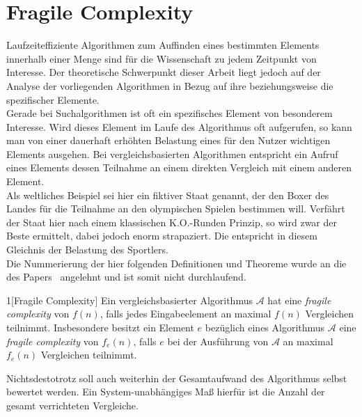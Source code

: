 \section{Fragile Complexity}	%

\noindent
Laufzeiteffiziente Algorithmen zum Auffinden eines bestimmten Elements innerhalb einer Menge sind für die Wissenschaft zu jedem Zeitpunkt von Interesse. Der theoretische Schwerpunkt dieser Arbeit liegt jedoch auf der Analyse der vorliegenden Algorithmen in Bezug auf ihre \fg beziehungsweise die spezifischer Elemente.\\[.1cm]
Gerade bei Suchalgorithmen ist oft ein spezifisches Element von besonderem Interesse. Wird dieses Element im Laufe des Algorithmus oft aufgerufen, so kann man von einer dauerhaft erhöhten Belastung eines für den Nutzer wichtigen Elements ausgehen. Bei vergleichsbasierten Algorithmen entspricht ein Aufruf eines Elements dessen Teilnahme an einem direkten Vergleich mit einem anderen Element.\\[.05cm]
Als weltliches Beispiel sei hier ein fiktiver Staat genannt, der den Boxer des Landes für die Teilnahme an den olympischen Spielen bestimmen will. Verfährt der Staat hier nach einem klassischen K.O.-Runden Prinzip, so wird zwar der Beste ermittelt, dabei jedoch enorm strapaziert. Die \fg entspricht in diesem Gleichnis der Belastung des Sportlers.\\[.05cm]
Die Nummerierung der hier folgenden Definitionen und Theoreme wurde an die des Papers~\cite{meyer2} angelehnt und ist somit nicht durchlaufend.
\begin{manualdefinition}{1}[Fragile Complexity]\label{def: fgc}
Ein vergleichsbasierter Algorithmus $\mathcal{A}$ hat eine \textit{fragile complexity} von $f(n)$, falls jedes Eingabeelement an maximal $f(n)$ Vergleichen teilnimmt. Insbesondere besitzt ein Element $e$ bezüglich eines Algorithmus $\mathcal{A}$ eine \textit{fragile complexity} von $f_e(n)$, falls $e$ bei der Ausführung von $\mathcal{A}$ an maximal $f_e(n)$ Vergleichen teilnimmt.
\end{manualdefinition}

\noindent
Nichtsdestotrotz soll auch weiterhin der Gesamtaufwand des Algorithmus selbst bewertet werden. Ein System-unabhängiges Maß hierfür ist die Anzahl der gesamt verrichteten Vergleiche.  

